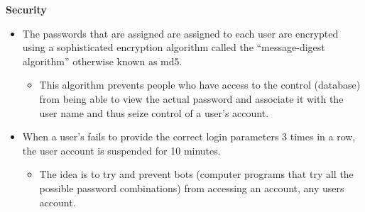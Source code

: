 \documentclass[10pt,a4paper]{article}
\begin{document}
\begin{center}\textbf{Security}\end{center}
                \begin{itemize}
                        \item The passwords that are assigned are assigned to each user are encrypted using a sophisticated encryption algorithm called the “message-digest algorithm” otherwise known as md5.
                        \begin{itemize}
                                \item  This algorithm prevents people who have access to the control (database) from being able to view the actual password and associate it with the user name and thus seize control of a user’s account.
                        \end{itemize}
                        \end{itemize}

                \begin{itemize}
                        \item  When a user’s fails to provide the correct login parameters 3 times in a row, the user account is suspended for 10 minutes.
                        \begin{itemize}
                                \item  The idea is to try and prevent bots (computer programs that try all the possible password combinations) from accessing an account,  any users account.
                        \end{itemize}
                \end{itemize}
\end{document}
